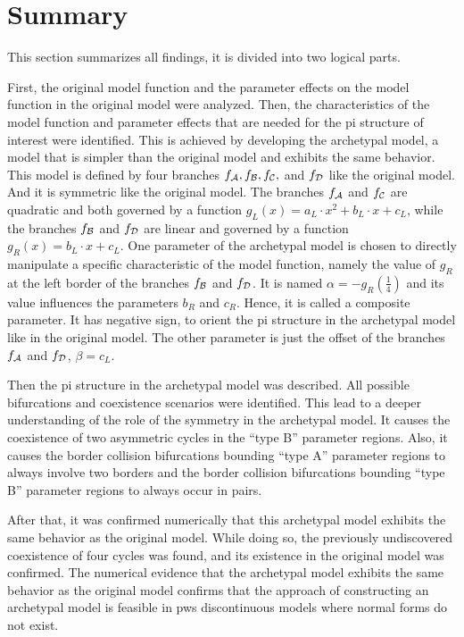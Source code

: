 \section{Summary}
\label{sec:concl.sum}

This section summarizes all findings, it is divided into two logical parts.

First, the original model function and the parameter effects on the model function in the original model were analyzed.
Then, the characteristics of the model function and parameter effects that are needed for the \gls{pi} structure of interest were identified.
This is achieved by developing the archetypal model, a model that is simpler than the original model and exhibits the same behavior.
This model is defined by four branches $f_{\mathcal{A}}, f_{\mathcal{B}}, f_{\mathcal{C}},$ and $f_{\mathcal{D}}$ like the original model.
And it is symmetric like the original model.
The branches $f_{\mathcal{A}}$ and $f_{\mathcal{C}}$ are quadratic and both governed by a function $g_L(x) = a_L \cdot x^2 + b_L \cdot x + c_L$, while the branches $f_{\mathcal{B}}$ and $f_{\mathcal{D}}$ are linear and governed by a function $g_R(x) = b_L \cdot x + c_L$.
One parameter of the archetypal model is chosen to directly manipulate a specific characteristic of the model function, namely the value of $g_R$ at the left border of the branches $f_{\mathcal{B}}$ and $f_{\mathcal{D}}$.
It is named $\alpha = -g_R\left(\frac{1}{4}\right)$ and its value influences the parameters $b_R$ and $c_R$.
Hence, it is called a composite parameter.
It has negative sign, to orient the \gls{pi} structure in the archetypal model like in the original model.
The other parameter is just the offset of the branches $f_{\mathcal{A}}$ and $f_{\mathcal{D}}$, $\beta = c_L$.

Then the \gls{pi} structure in the archetypal model was described.
All possible bifurcations and coexistence scenarios were identified.
This lead to a deeper understanding of the role of the symmetry in the archetypal model.
It causes the coexistence of two asymmetric cycles in the ``type B'' parameter regions.
Also, it causes the border collision bifurcations bounding ``type A'' parameter regions to always involve two borders
and the border collision bifurcations bounding ``type B'' parameter regions to always occur in pairs.

After that, it was confirmed numerically that this archetypal model exhibits the same behavior as the original model.
While doing so, the previously undiscovered coexistence of four cycles was found, and its existence in the original model was confirmed.
The numerical evidence that the archetypal model exhibits the same behavior as the original model confirms that the approach of constructing an archetypal model is feasible in \gls{pws} discontinuous models where normal forms do not exist.

